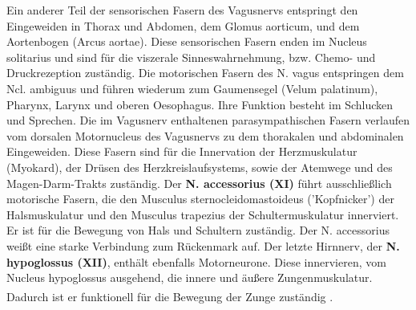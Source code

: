 \documentclass[12pt,a4paper,pdftex]{article}
\begin{document}
Ein anderer Teil der sensorischen Fasern des Vagusnervs entspringt den Eingeweiden in Thorax und Abdomen, dem Glomus aorticum, und dem Aortenbogen (Arcus aortae). Diese sensorischen Fasern enden im Nucleus solitarius und sind für die viszerale Sinneswahrnehmung, bzw. Chemo- und Druckrezeption zuständig. Die motorischen Fasern des N. vagus entspringen dem Ncl. ambiguus und führen wiederum zum Gaumensegel (Velum palatinum), Pharynx, Larynx und oberen Oesophagus. Ihre Funktion besteht im Schlucken und Sprechen. Die im Vagusnerv enthaltenen parasympathischen Fasern verlaufen vom dorsalen Motornucleus des Vagusnervs zu dem thorakalen und abdominalen Eingeweiden. Diese Fasern sind für die Innervation der Herzmuskulatur (Myokard), der Drüsen des Herzkreislaufsystems, sowie der Atemwege und des Magen-Darm-Trakts zuständig. Der \textbf{N. accessorius (XI)} führt ausschließlich motorische Fasern, die den Musculus sternocleidomastoideus ('Kopfnicker') der Halsmuskulatur und den Musculus trapezius der Schultermuskulatur innerviert. Er ist für die Bewegung von Hals und Schultern zuständig. Der N. accessorius weißt eine starke Verbindung zum Rückenmark auf. Der letzte Hirnnerv, der \textbf{N. hypoglossus (XII)}, enthält ebenfalls Motorneurone. Diese innervieren, vom Nucleus hypoglossus ausgehend, die innere und äußere Zungenmuskulatur. Dadurch ist er funktionell für die Bewegung der Zunge zuständig \textsuperscript{\cite[10]{crossman2014neuroanatomy}}.
\end{document}
